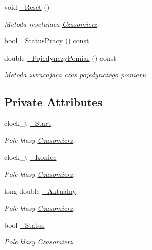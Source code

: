 \begin{DoxyCompactItemize}
void \hyperlink{class_czasomierz_a1f2c55e5be7f93f3db9b02eb5757cc78}{\-\_\-\-Reset} ()
\begin{DoxyCompactList}\small\item\em Metoda resetujaca \hyperlink{class_czasomierz}{Czasomierz}. \end{DoxyCompactList}\item 
bool \hyperlink{class_czasomierz_ab5977fad1080924fe85f70157de7b4db}{\-\_\-\-Status\-Pracy} () const 
\item 
double \hyperlink{class_czasomierz_a02353d27a6e73f00e41c4c0b40990d58}{\-\_\-\-Pojedynczy\-Pomiar} () const 
\begin{DoxyCompactList}\small\item\em Metoda zwracajaca czas pojedynczego pomiaru. \end{DoxyCompactList}\end{DoxyCompactItemize}
\subsection*{Private Attributes}
\begin{DoxyCompactItemize}
\item 
clock\-\_\-t \hyperlink{class_czasomierz_aba798db3d70227410bfafbb01a52d755}{\-\_\-\-Start}
\begin{DoxyCompactList}\small\item\em Pole klasy \hyperlink{class_czasomierz}{Czasomierz}. \end{DoxyCompactList}\item 
clock\-\_\-t \hyperlink{class_czasomierz_a1d791b2017e7f992a2206155982055af}{\-\_\-\-Koniec}
\begin{DoxyCompactList}\small\item\em Pole klasy \hyperlink{class_czasomierz}{Czasomierz}. \end{DoxyCompactList}\item 
long double \hyperlink{class_czasomierz_ae09344cf8ca5613cd557cb4fcf9aa046}{\-\_\-\-Aktualny}
\begin{DoxyCompactList}\small\item\em Pole klasy \hyperlink{class_czasomierz}{Czasomierz}. \end{DoxyCompactList}\item 
bool \hyperlink{class_czasomierz_a5eb9aa3fd9f0fb8af343f2865d490e64}{\-\_\-\-Status}
\begin{DoxyCompactList}\small\item\em Pole klasy \hyperlink{class_czasomierz}{Czasomierz}. \end{DoxyCompactList}\end{DoxyCompactItemize}



